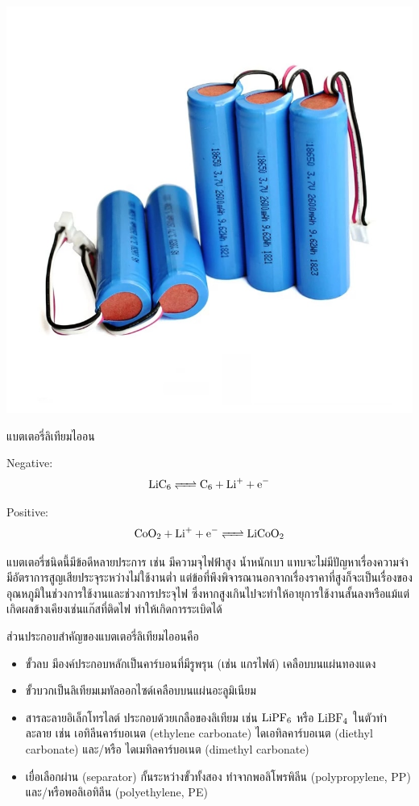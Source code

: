 \documentclass[a4paper,nobib,openany,10pt]{tufte-book}
\begin{document}
\begin{marginfigure}
  \centering
  \includegraphics[width=\textwidth]{pictures/liion-battery}
\caption{แบตเตอรี่ลิเทียมไออน}
\end{marginfigure}

Negative:
$$ \ce{LiC6 <=> C6 + Li^+ + e^-} $$

Positive:
$$ \ce{CoO2 + Li^+ + e^- <=> LiCoO2} $$

แบตเตอรี่ชนิดนี้มีข้อดีหลายประการ เช่น มีความจุไฟฟ้าสูง น้ำหนักเบา แทบจะไม่มีปัญหาเรื่องความจำ มีอัตราการสูญเสียประจุระหว่างไม่ใช้งานต่ำ แต่ข้อที่พึงพิจารณานอกจากเรื่องราคาที่สูงก็จะเป็นเรื่องของอุณหภูมิในช่วงการใช้งานและช่วงการประจุไฟ ซึ่งหากสูงเกินไปจะทำให้อายุการใช้งานสั้นลงหรือแม้แต่เกิดผลข้างเคียงเช่นแก๊สที่ติดไฟ ทำให้เกิดการระเบิดได้

ส่วนประกอบสำคัญของแบตเตอรี่ลิเทียมไออนคือ

\begin{itemize}
\item ขั้วลบ มีองค์ประกอบหลักเป็นคาร์บอนที่มีรูพรุน (เช่น แกรไฟต์) เคลือบบนแผ่นทองแดง
\item ขั้วบวกเป็นลิเทียมเมทัลออกไซด์เคลือบบนแผ่นอะลูมิเนียม
\item สารละลายอิเล็กโทรไลต์ ประกอบด้วยเกลือของลิเทียม เช่น \(\ce{LiPF6}\) หรือ \(\ce{LiBF4}\) ในตัวทำละลาย เช่น เอทิลีนคาร์บอเนต (ethylene carbonate) ไดเอทิลคาร์บอเนต (diethyl carbonate) และ/หรือ ไดเมทิลคาร์บอเนต (dimethyl carbonate)
\item เยื่อเลือกผ่าน (separator) กั้นระหว่างขั้วทั้งสอง ทำจากพอลิโพรพิลีน (polypropylene, PP) และ/หรือพอลิเอทิลีน (polyethylene, PE)
\end{itemize}
\end{document}

